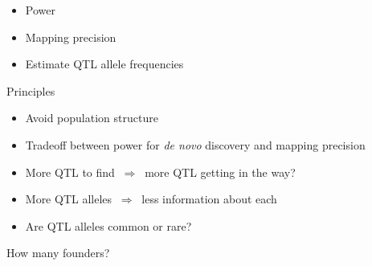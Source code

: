 \documentclass[12pt]{article}
\newcommand{\headsize}{\fontsize{35}{35} \selectfont}
\newcommand{\smallersize}{\fontsize{20}{25} \selectfont}
\begin{document}
{\vspace{15mm}

\hfill \begin{minipage}{9in}
\color{myblue}
\begin{itemize}
\itemsep24pt
\item Power
\item Mapping precision
\item Estimate QTL allele frequencies
\end{itemize}
\end{minipage}



\newpage


\headsize \color{myyellow}
\hfill \begin{minipage}{5.75in}
\centering
Principles
\end{minipage}

\vspace{25mm}

\color{mywhite}
\smallersize

\hfill \begin{minipage}{10in}
\begin{itemize}
\itemsep24pt
\item Avoid population structure
\item Tradeoff between {\color{myblue} power for \emph{de novo\/} discovery}
  and {\color{myblue} mapping precision}
\item More QTL to find $ \ \Rightarrow \ $ more QTL getting in the way?
\item More QTL alleles $ \ \Rightarrow \ $ less information about each
\item Are QTL alleles common or rare?
\end{itemize}
\end{minipage}



\newpage


\headsize \color{myyellow}
\hfill \begin{minipage}{5.75in}
\centering
How many founders?
\end{minipage}

\vspace{25mm}

\color{mywhite}
\smallersize

\hspace{0.5in} \begin{minipage}[t]{4.8in}
\vspace*{0mm}


\end{minipage}}
\end{document}
